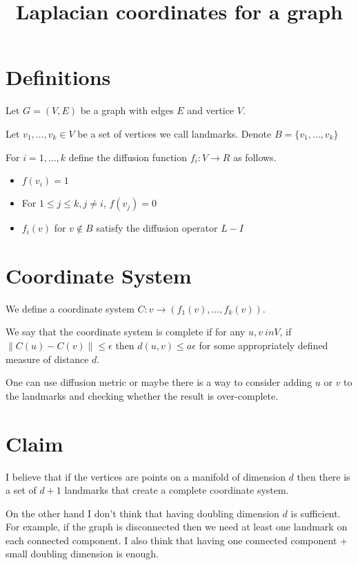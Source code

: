 \documentclass[12pt]{article}
\title{Laplacian coordinates for a graph}
\begin{document}
 
 \maketitle

 \section{Definitions}
 Let $G=(V,E)$ be a graph with edges $E$ and vertice $V$.

 Let $v_1,\ldots,v_k \in V$ be a set of vertices we call
 landmarks. Denote $B = \{v_1,\ldots,v_k\}$

 For $i = 1,\ldots,k$ define the diffusion function $f_i:V \to R$ as
 follows.
 \begin{itemize}
 \item  $f(v_i) = 1$
 \item For $1\leq j \leq k, j \neq i$, $f(v_j) = 0$
 \item $f_i(v)$ for $v \notin B$ satisfy the diffusion operator $L-I$
 \end{itemize}

 \section{Coordinate System}

 We define a coordinate system  $C:v \to (f_1(v),\ldots,f_k(v))$.

 We say that the coordinate system is complete if for any $u,v \ in
 V$, if $\|C(u) - C(v)\| \leq \epsilon$ then $d(u,v) \leq a
 \epsilon$ for some appropriately defined measure of distance $d$.

 One can use diffusion metric or maybe there is a way to consider
 adding $u$ or $v$ to the landmarks and checking whether the result is over-complete.

 \section{Claim}
 I believe that if the vertices are points on a  manifold of dimension
 $d$ then there is a set of $d+1$ landmarks that create a complete
 coordinate system.

 On the other hand I don't think that having doubling dimension $d$ is
 sufficient. For example, if the graph is disconnected then we need at
 least one landmark on each connected component. I also think that
 having one connected component + small doubling dimension is enough.
 
 
\end{document}
